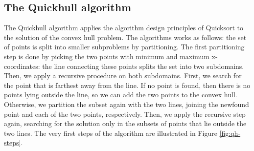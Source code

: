 \documentclass[]{finalproject}
\begin{document}
\subsection{The Quickhull algorithm}
The Quickhull algorithm applies the algorithm design principles of Quicksort to the solution of the convex hull problem.
The algorithms works as follows:
the set of points is split into smaller subproblems by partitioning.
The first partitioning step is done by picking the two points with minimum and maximum x-coordinates:
the line connecting these points splits the set into two subdomains.
Then, we apply a recursive procedure on both subdomains.
First, we search for the point that is farthest away from the line.
If no point is found, then there is no points lying outside the line, so we can add the two points to the convex hull.
Otherwise, we partition the subset again with the two lines, joining the newfound point and each of the two points, respectively.
Then, we apply the recursive step again, searching for the solution only in the subsets of points that lie outside the two lines.
The very first steps of the algorithm are illustrated in Figure \ref{fig:qh-steps}.
\end{document}
